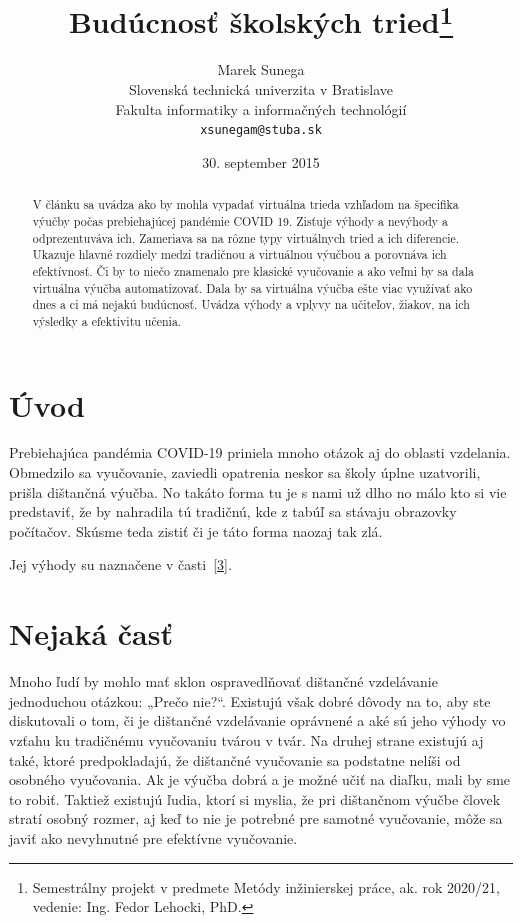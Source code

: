 \documentclass[10pt,twoside,slovak,a4paper]{article}
\title{Budúcnosť školských tried\thanks{Semestrálny projekt v predmete Metódy inžinierskej práce, ak. rok 2020/21, vedenie: Ing. Fedor Lehocki, PhD.}} %
\author{Marek Sunega\\[2pt]
	{\small Slovenská technická univerzita v Bratislave}\\
	{\small Fakulta informatiky a informačných technológií}\\
	{\small \texttt{xsunegam@stuba.sk}}
	}
\date{\small 30. september 2015} %
\begin{document}
\maketitle

\begin{abstract}
    V článku sa uvádza ako by mohla vypadať virtuálna trieda vzhľadom na špecifika výučby počas 
	prebiehajúcej pandémie COVID 19. Zisťuje výhody a nevýhody a odprezentuváva ich. Zameriava 
	sa na rôzne typy virtuálnych tried a ich diferencie. Ukazuje hlavné rozdiely medzi tradičnou 
	a virtuálnou výučbou a porovnáva ich efektívnosť. Či by to niečo znamenalo pre klasické vyučovanie 
	a ako veľmi by sa dala virtuálna výučba automatizovať. Dala by sa virtuálna výučba ešte viac 
	využívať ako dnes a ci má nejakú budúcnosť. Uvádza výhody a vplyvy na učiteľov, žiakov, na ich 
	výsledky a efektivitu učenia.
\end{abstract}



\section{Úvod}
Prebiehajúca pandémia COVID-19 priniela mnoho otázok aj do oblasti vzdelania. Obmedzilo sa vyučovanie, zaviedli 
opatrenia neskor sa školy úplne uzatvorili, prišla dištančná výučba. No takáto forma tu je s nami už dlho no 
málo kto si vie predstaviť, že by nahradila tú tradičnú, kde z tabúľ sa stávaju obrazovky počítačov. Skúsme teda zistiť
či je táto forma naozaj tak zlá.

Jej výhody su naznačene v časti~\ref{3}.



\section{Nejaká časť} \label{nejaka}
Mnoho ľudí by mohlo mať sklon ospravedlňovať dištančné vzdelávanie jednoduchou otázkou: „Prečo nie?“.
Existujú však dobré dôvody na to, aby ste diskutovali o tom, či je dištančné vzdelávanie oprávnené a aké sú 
jeho výhody vo vzťahu ku tradičnému vyučovaniu tvárou v tvár. Na druhej strane existujú aj také, 
ktoré predpokladajú, že dištančné vyučovanie sa podstatne nelíši od osobného vyučovania. Ak je výučba dobrá a 
je možné učiť na diaľku, mali by sme to robiť. Taktiež existujú ľudia, ktorí si myslia, že pri dištančnom výučbe 
človek stratí osobný rozmer, aj keď to nie je potrebné pre samotné vyučovanie, môže sa javiť ako nevyhnutné pre 
efektívne vyučovanie.\cite{ency}
\end{document}
